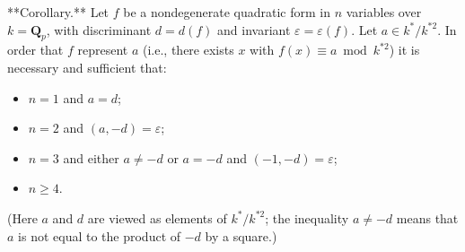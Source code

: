 **Corollary.** Let $f$ be a nondegenerate quadratic form in $n$ variables over $k = \mathbf{Q}_p$, with discriminant $d = d(f)$ and invariant $\varepsilon = \varepsilon(f)$. Let $a \in k^*/k^{*2}$. In order that $f$ represent $a$ (i.e., there exists $x$ with $f(x) \equiv a \bmod k^{*2}$) it is necessary and sufficient that:

\begin{itemize}
\item[(i)] $n = 1$ and $a = d$;
\item[(ii)] $n = 2$ and $(a, -d) = \varepsilon$;
\item[(iii)] $n = 3$ and either $a \neq -d$ or $a = -d$ and $(-1, -d) = \varepsilon$;
\item[(iv)] $n \geq 4$.
\end{itemize}

(Here $a$ and $d$ are viewed as elements of $k^*/k^{*2}$; the inequality $a \neq -d$ means that $a$ is not equal to the product of $-d$ by a square.)
